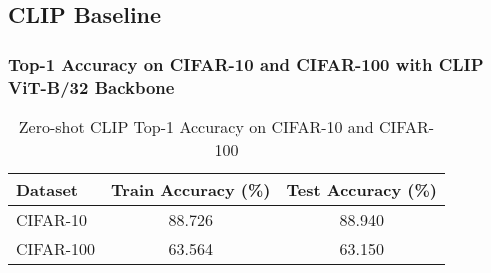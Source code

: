 \documentclass[a4paper]{article}
\begin{document}
\subsection{CLIP Baseline}
\subsubsection{Top-1 Accuracy on CIFAR-10 and CIFAR-100 with CLIP ViT-B/32 Backbone}
\begin{table}[h]
    \centering
    \begin{tabular}{|l|c|c|}
    \hline
    \textbf{Dataset} & \textbf{Train Accuracy (\%)} & \textbf{Test Accuracy (\%)} \\ \hline
    CIFAR-10 & 88.726 & 88.940 \\ \hline
    CIFAR-100 & 63.564 & 63.150 \\ \hline
    \end{tabular}
    \caption{Zero-shot CLIP Top-1 Accuracy on CIFAR-10 and CIFAR-100}
    \label{tab:clip_accuracy}
\end{table}    
\end{document}
